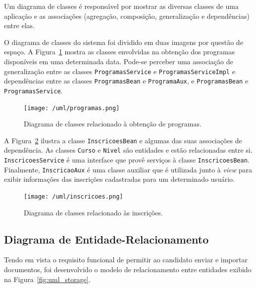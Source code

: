\documentclass[
  10.5pt,				  %
	openright,			%
	twoside,			  %
  a5paper,
  chapter=TITLE,	%
	section=TITLE,	%
  hyphens,        %
	english,        %
	brazil          %
]{abntex2}
\begin{document}
Um diagrama de classes é responsável por mostrar as diversas classes de uma aplicação e as associações (agregação, composição, generalização e dependências) entre elas.

O diagrama de classes do sistema foi dividido em duas imagens por questão de espaço. A Figura~\ref{fig:uml_er1} mostra as classes envolvidas na obtenção dos programas disponíveis em uma determinada data. Pode-se perceber uma associação de generalização entre as classes \texttt{ProgramasService} e \texttt{ProgramasServiceImpl} e dependências entre as classes \texttt{ProgramasBean} e \texttt{ProgramaAux}, e \texttt{ProgramasBean} e \texttt{ProgramasService}.

\begin{figure}[!ht]
  \caption{\label{fig:uml_er1} Diagrama de classes relacionado à obtenção de programas. }
  \begin{center}
    \texttt{[image: /uml/programas.png]}
  \end{center}
\end{figure}

A Figura~\ref{fig:uml_er2} ilustra a classe \texttt{InscricoesBean} e algumas das suas associações de dependência. As classes \texttt{Curso} e \texttt{Nivel} são entidades e estão relacionadas entre si. \texttt{InscricoesService} é uma interface que provê serviços à classe \texttt{InscricoesBean}. Finalmente, \texttt{InscricaoAux} é uma classe auxiliar que é utilizada junto à \emph{view} para exibir informações das inscrições cadastradas para um determinado usuário.

\begin{landscape}
\begin{figure}[!ht]
  \caption{\label{fig:uml_er2} Diagrama de classes relacionado às inscrições. }
  \begin{center}
    \texttt{[image: /uml/inscricoes.png]}
  \end{center}
\end{figure}
\end{landscape}

\subsection{Diagrama de Entidade-Relacionamento}

Tendo em vista o requisito funcional de permitir ao candidato enviar e importar documentos, foi desenvolvido o modelo de relacionamento entre entidades exibido na Figura~\ref{fig:uml_storage}.
\end{document}
